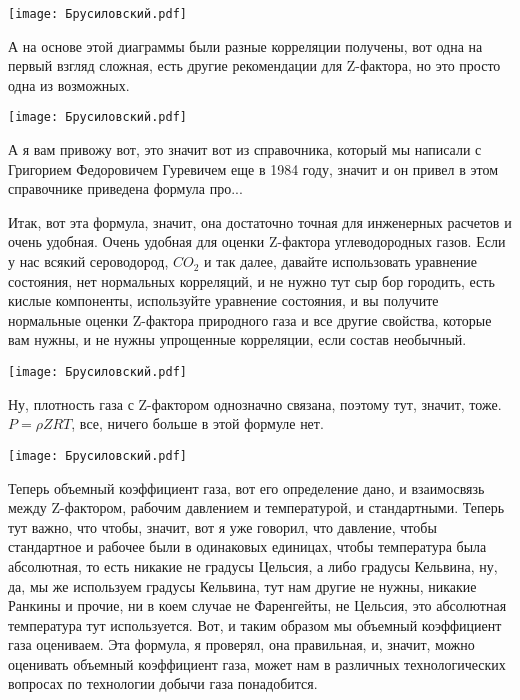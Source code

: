 \documentclass[main.tex]{subfiles}
\begin{document}
\begin{center}
\texttt{[image: Брусиловский.pdf]}
\end{center}

А на основе этой диаграммы были разные корреляции получены, вот одна на первый взгляд сложная, есть другие рекомендации для Z-фактора, но это просто одна из возможных.

\begin{center}
\texttt{[image: Брусиловский.pdf]}
\end{center}

А я вам привожу вот, это значит вот из справочника, который мы написали с Григорием Федоровичем Гуревичем еще в 1984 году, значит и он привел в этом справочнике приведена формула про...

Итак, вот эта формула, значит, она достаточно точная для инженерных расчетов и очень удобная.
Очень удобная для оценки Z-фактора углеводородных газов.
Если у нас всякий сероводород, $CO_2$ и так далее, давайте использовать уравнение состояния, нет нормальных корреляций, и не нужно тут сыр бор городить, есть кислые компоненты, используйте уравнение состояния, и вы получите нормальные оценки Z-фактора природного газа и все другие свойства, которые вам нужны, и не нужны упрощенные корреляции, если состав необычный.

\begin{center}
\texttt{[image: Брусиловский.pdf]}
\end{center}

Ну, плотность газа с Z-фактором однозначно связана, поэтому тут, значит, тоже.
$P=\rho ZRT$, все, ничего больше в этой формуле нет.

\begin{center}
\texttt{[image: Брусиловский.pdf]}
\end{center}

Теперь объемный коэффициент газа, вот его определение дано, и взаимосвязь между Z-фактором, рабочим давлением и температурой, и стандартными.
Теперь тут важно, что чтобы, значит, вот я уже говорил, что давление, чтобы стандартное и рабочее были в одинаковых единицах, чтобы температура была абсолютная, то есть никакие не градусы Цельсия, а либо градусы Кельвина, ну, да, мы же используем градусы Кельвина, тут нам другие не нужны, никакие Ранкины и прочие, ни в коем случае не Фаренгейты, не Цельсия, это абсолютная температура тут используется.
Вот, и таким образом мы объемный коэффициент газа оцениваем.
Эта формула, я проверял, она правильная, и, значит, можно оценивать объемный коэффициент газа, может нам в различных технологических вопросах по технологии добычи газа понадобится.
\end{document}
